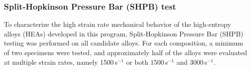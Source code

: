 





\subsubsection{Split-Hopkinson Pressure Bar (SHPB) test}

To characterize the high strain rate mechanical behavior of the high-entropy alloys (HEAs) developed in this program, Split-Hopkinson Pressure Bar (SHPB) testing was performed on all candidate alloys. For each composition, a minimum of two specimens were tested, and approximately half of the alloys were evaluated at multiple strain rates, namely 1500\,s$^{-1}$ or both 1500\,s$^{-1}$ and 3000\,s$^{-1}$. 

